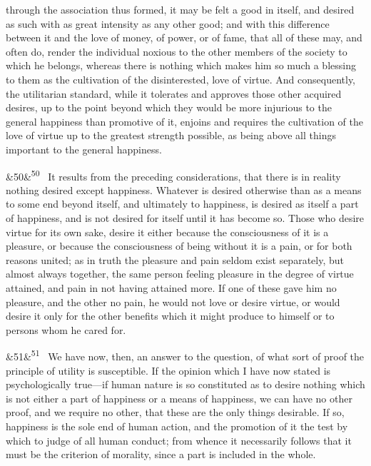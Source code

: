 \documentclass[12pt]{article}
\newcommand{\para}[1][]{\par\noindent\ifx&#1&\else\textsuperscript{\footnotesize #1}~\fi}
\begin{document}
through the association thus formed, it may be felt a good in itself, and desired as such with as great intensity as any other good; and with this difference between it and the love of money, of power, or of fame, that all of these may, and often do, render the individual noxious to the other members of the society to which he belongs, whereas there is nothing which makes him so much a blessing to them as the cultivation of the disinterested, love of virtue. And consequently, the utilitarian standard, while it tolerates and approves those other acquired desires, up to the point beyond which they would be more injurious to the general happiness than promotive of it, enjoins and requires the cultivation of the love of virtue up to the greatest strength possible, as being above all things important to the general happiness.

\para[50] It results from the preceding considerations, that there is in reality nothing desired except happiness. Whatever is desired otherwise than as a means to some end beyond itself, and ultimately to happiness, is desired as itself a part of happiness, and is not desired for itself until it has become so. Those who desire virtue for its own sake, desire it either because the consciousness of it is a pleasure, or because the consciousness of being without it is a pain, or for both reasons united; as in truth the pleasure and pain seldom exist separately, but almost always together, the same person feeling pleasure in the degree of virtue attained, and pain in not having attained more. If one of these gave him no pleasure, and the other no pain, he would not love or desire virtue, or would desire it only for the other benefits which it might produce to himself or to persons whom he cared for.

\para[51] We have now, then, an answer to the question, of what sort of proof the principle of utility is susceptible. If the opinion which I have now stated is psychologically true---if human nature is so constituted as to desire nothing which is not either a part of happiness or a means of happiness, we can have no other proof, and we require no other, that these are the only things desirable. If so, happiness is the sole end of human action, and the promotion of it the test by which to judge of all human conduct; from whence it necessarily follows that it must be the criterion of morality, since a part is included in the whole.
\end{document}
